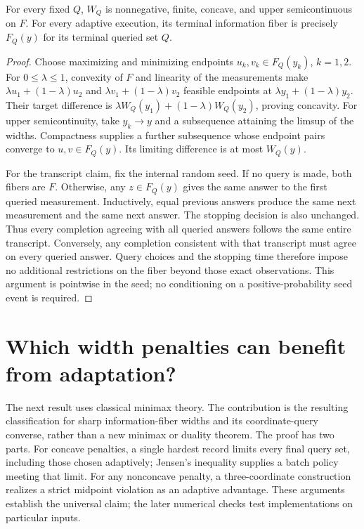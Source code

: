 \begin{proposition}
\label{prop:risk_concavity_transcript}
For every fixed $Q$, $W_Q$ is nonnegative, finite, concave, and upper
semicontinuous on $F$. For every adaptive execution, its terminal
information fiber is precisely $F_Q(y)$ for its terminal queried set $Q$.
\end{proposition}
\begin{proof}
Choose maximizing and minimizing endpoints $u_k,v_k\in F_Q(y_k)$,
$k=1,2$. For $0\le\lambda\le1$, convexity of $F$ and linearity of the
measurements make $\lambda u_1+(1-\lambda)u_2$ and
$\lambda v_1+(1-\lambda)v_2$ feasible endpoints at
$\lambda y_1+(1-\lambda)y_2$. Their target difference is
$\lambda W_Q(y_1)+(1-\lambda)W_Q(y_2)$, proving concavity.
For upper semicontinuity, take $y_k\to y$ and a subsequence attaining
the limsup of the widths. Compactness supplies a further subsequence
whose endpoint pairs converge to $u,v\in F_Q(y)$. Its limiting
difference is at most $W_Q(y)$.

For the transcript claim, fix the internal random seed. If no query is
made, both fibers are $F$. Otherwise, any
$z\in F_Q(y)$ gives the same answer to the first queried measurement.
Inductively, equal previous answers produce the same next measurement
and the same next answer. The stopping decision is also unchanged.
Thus every completion agreeing with all queried answers follows the
same entire transcript. Conversely, any completion consistent with
that transcript must agree on every queried answer. Query choices and
the stopping time therefore impose no additional restrictions on the
fiber beyond those exact observations. This argument is pointwise in the
seed; no conditioning on a positive-probability seed event is required.
\end{proof}

\section{Which width penalties can benefit from adaptation?}
\label{sec:risk_classification}
The next result uses classical minimax theory. The contribution is the
resulting classification for sharp information-fiber widths and its
coordinate-query converse, rather than a new minimax or duality theorem.
The proof has two parts. For concave penalties, a single hardest record
limits every final query set, including those chosen adaptively; Jensen's
inequality supplies a batch policy meeting that limit. For any nonconcave
penalty, a three-coordinate construction realizes a strict midpoint
violation as an adaptive advantage. These arguments establish the universal
claim; the later numerical checks test implementations on particular inputs.

